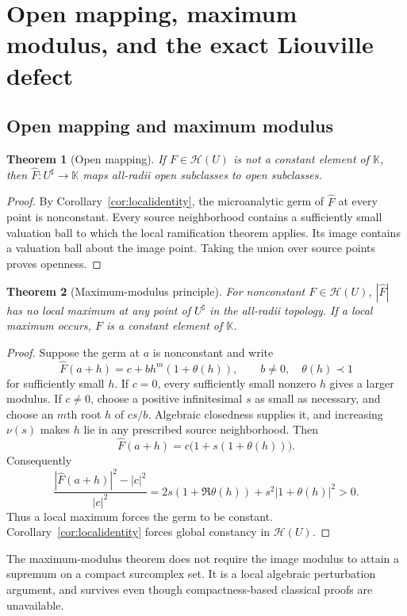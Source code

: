 \documentclass[11pt,oneside]{article}
\newtheorem{theorem}{Theorem}[section]
\theoremstyle{definition}\newtheorem{definition}[theorem]{Definition}
\newcommand{\K}{\mathbb K}
\newcommand{\HH}{\mathcal H}
\newcommand{\hatF}{\widehat F}
\newcommand{\val}{\nu}
\begin{document}
\section{Open mapping, maximum modulus, and the exact Liouville defect}\label{sec:geometry}
\subsection{Open mapping and maximum modulus}
\begin{theorem}[Open mapping]\label{thm:open}
If $F\in\HH(U)$ is not a constant element of $\K$, then $\hatF:U^\sharp\to\K$ maps all-radii open subclasses to open subclasses.
\end{theorem}
\begin{proof}
By Corollary~\ref{cor:localidentity}, the microanalytic germ of $\hatF$ at every point is nonconstant. Every source neighborhood contains a sufficiently small valuation ball to which the local ramification theorem applies. Its image contains a valuation ball about the image point. Taking the union over source points proves openness.
\end{proof}

\begin{theorem}[Maximum-modulus principle]\label{thm:maxmod}
For nonconstant $F\in\HH(U)$, $|\hatF|$ has no local maximum at any point of $U^\sharp$ in the all-radii topology. If a local maximum occurs, $F$ is a constant element of $\K$.
\end{theorem}
\begin{proof}
Suppose the germ at $a$ is nonconstant and write
\[
 \hatF(a+h)=c+bh^m(1+\theta(h)),\qquad b\ne0,
 \quad\theta(h)\prec1
\]
for sufficiently small $h$. If $c=0$, every sufficiently small nonzero $h$ gives a larger modulus. If $c\ne0$, choose a positive infinitesimal $s$ as small as necessary, and choose an $m$th root $h$ of $cs/b$. Algebraic closedness supplies it, and increasing $\val(s)$ makes $h$ lie in any prescribed source neighborhood. Then
\[
 \hatF(a+h)=c\bigl(1+s(1+\theta(h))\bigr).
\]
Consequently
\[
 \frac{|\hatF(a+h)|^2-|c|^2}{|c|^2}
 =2s(1+\Re\theta(h))+s^2|1+\theta(h)|^2>0.
\]
Thus a local maximum forces the germ to be constant. Corollary~\ref{cor:localidentity} forces global constancy in $\HH(U)$.
\end{proof}
The maximum-modulus theorem does not require the image modulus to attain a supremum on a compact surcomplex set. It is a local algebraic perturbation argument, and survives even though compactness-based classical proofs are unavailable.
\end{document}
